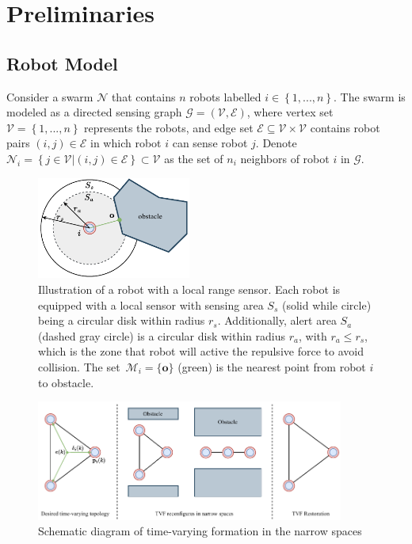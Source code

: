 \section{Preliminaries}\label{sec2}
\subsection{Robot Model}
Consider a swarm $\mathcal{N}$ that contains $n$ robots labelled $i\in\left\{1,...,n\right\}$. The swarm is modeled as a directed sensing graph $\mathcal{G}=\left(\mathcal{V},\mathcal{E}\right)$, where vertex set $\mathcal{V} = \left\{1,..., n\right\}$ represents the robots, and edge set $\mathcal{E}\subseteq\mathcal{V}\times \mathcal{V}$ contains robot pairs $\left(i, j\right)\in\mathcal{E}$ in which robot $i$ can sense robot $j$. Denote $\mathcal{N}_i=\left\{j\in\mathcal{V}|\left(i,j\right)\in\mathcal{E}\right\}\subset\mathcal{V}$ as the set of $n_i$ neighbors of robot $i$ in $\mathcal{G}$.

\begin{figure}
    \centering
    \includegraphics[width=0.45\textwidth]{paper2/images/model.pdf}
    \caption{Illustration of a robot with a local range sensor. Each robot is equipped with a local sensor with sensing area $S_s$ (solid while circle) being a circular disk within radius $r_s$. Additionally, alert area $S_a$ (dashed gray circle) is a circular disk within radius $r_a$, with $r_a\leq r_s$, which is the zone that robot will active the repulsive force to avoid collision. The set~$\mathcal{M}_i=\{\mathbf{o}\}$ (green) is the nearest point from robot $i$ to obstacle.}
    \label{fig:1model}
\end{figure}

\begin{figure}
    \centering
    \includegraphics[width=0.9\textwidth]{paper2/images/problem.pdf}
    \caption{Schematic diagram of time-varying formation in the narrow spaces}
    \label{fig:1problem}
\end{figure}

